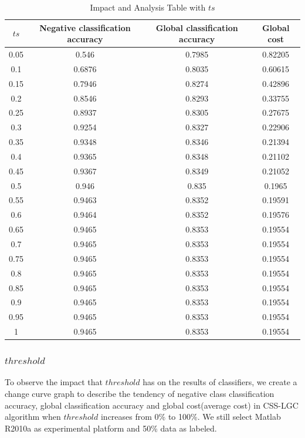 \documentclass{svjour3}                     %
\begin{document}
\begin{table}[htbp]
  \centering
    \begin{tabular}{c c c c}
    \toprule
    $ts$  & Negative classification accuracy  &  Global classification accuracy & Global cost \\
    \midrule
    0.05  & 0.546 & 0.7985 & 0.82205 \\
    0.1   & 0.6876 & 0.8035 & 0.60615 \\
    0.15  & 0.7946 & 0.8274 & 0.42896 \\
    0.2   & 0.8546 & 0.8293 & 0.33755 \\
    0.25  & 0.8937 & 0.8305 & 0.27675 \\
    0.3   & 0.9254 & 0.8327 & 0.22906 \\
    0.35  & 0.9348 & 0.8346 & 0.21394 \\
    0.4   & 0.9365 & 0.8348 & 0.21102 \\
    0.45  & 0.9367 & 0.8349 & 0.21052 \\
    0.5   & 0.946 & 0.835 & 0.1965 \\
    0.55  & 0.9463 & 0.8352 & 0.19591 \\
    0.6   & 0.9464 & 0.8352 & 0.19576 \\
    0.65  & 0.9465 & 0.8353 & 0.19554 \\
    0.7   & 0.9465 & 0.8353 & 0.19554 \\
    0.75  & 0.9465 & 0.8353 & 0.19554 \\
    0.8   & 0.9465 & 0.8353 & 0.19554 \\
    0.85  & 0.9465 & 0.8353 & 0.19554 \\
    0.9   & 0.9465 & 0.8353 & 0.19554 \\
    0.95  & 0.9465 & 0.8353 & 0.19554 \\
    1     & 0.9465 & 0.8353 & 0.19554 \\
    \bottomrule
    \end{tabular}%
  \caption{Impact and Analysis Table with $ts$} \label{tab:ts}%
\end{table}%

\subsubsection{$threshold$}
To observe the impact that $threshold$ has on the results of classifiers, we create a change curve graph to describe the tendency of negative class classification accuracy, global classification accuracy and global cost(average cost) in CSS-LGC algorithm when $threshold$ increases from 0\% to 100\%. We still select Matlab R2010a as experimental platform and 50\% data as labeled.
\end{document}
